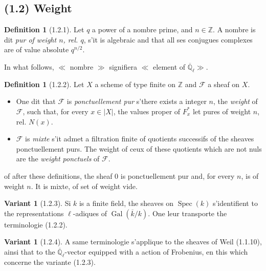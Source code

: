 \documentclass[12pt,a4paper]{article}
\theoremstyle{plain}
\theoremstyle{definition}
\newtheorem{definition}[theorem]{Definition}
\newtheorem{var}[theorem]{Variant}
\theoremstyle{definition}
\theoremstyle{remark}
\DeclareMathOperator{\Gal}{Gal}
\DeclareMathOperator{\Spec}{Spec}
\begin{document}
\subsection*{(1.2) Weight}

\begin{definition}[1.2.1]
Let $q$ a power of a nombre prime, and $n \in \mathbb{Z}$. A nombre is dit \emph{pur of weight $n$, rel. $q$}, s'it is algebraic and that all ses conjugues complexes are of value absolute $q^{n/2}$.

In what follows, $\ll$ nombre $\gg$ signifiera $\ll$ element of $\overline{\mathbb{Q}}_\ell \gg$.
\end{definition}

\begin{definition}[1.2.2]
Let $X$ a scheme of type finite on $\mathbb{Z}$ and $\mathscr{F}$ a sheaf on $X$.
\begin{itemize}[nosep]
\item[(i)] One dit that $\mathscr{F}$ is \emph{ponctuellement pur} s'there exists a integer $n$, the \emph{weight} of $\mathscr{F}$, such that, for every $x \in |X|$, the values proper of $F_x^*$ let pures of weight $n$, rel. $N(x)$.
\item[(ii)] $\mathscr{F}$ is \emph{mixte} s'it admet a filtration finite of quotients successifs of the sheaves ponctuellement purs. The weight of ceux of these quotients which are not nuls are the \emph{weight ponctuels} of $\mathscr{F}$.
\end{itemize}
\end{definition}

of after these definitions, the sheaf $0$ is ponctuellement pur and, for every $n$, is of weight $n$. It is mixte, of set of weight vide.

\begin{var}[1.2.3]
Si $k$ is a finite field, the sheaves on $\Spec(k)$ s'identifient to the representations $\ell$-adiques of $\Gal(\overline{k}/k)$. One leur transporte the terminologie (1.2.2).
\end{var}

\begin{var}[1.2.4]
A same terminologie s'applique to the sheaves of Weil (1.1.10), ainsi that to the $\overline{\mathbb{Q}}_\ell$-vector equipped with a action of Frobenius, en this which concerne the variante (1.2.3).
\end{var}
\end{document}

